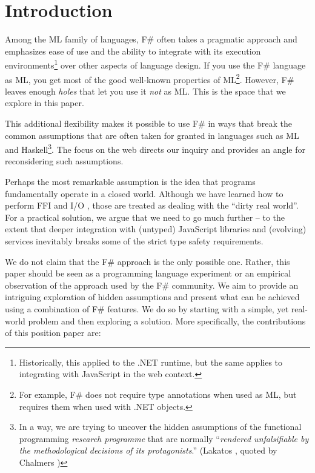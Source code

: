 \documentclass[submission,copyright,creativecommons]{eptcs}
\begin{document}
\section{Introduction}

Among the ML family of languages, F\# often takes a pragmatic approach and emphasizes ease of use
and the ability to integrate with its execution environments\footnote{Historically, this applied
to the .NET runtime, but the same applies to integrating with JavaScript in the web context.} over
other aspects of language design. If you use the F\# language as ML, you get most of the good
well-known properties of ML\footnote{For example, F\# does not require type annotations when used
as ML, but requires them when used with .NET objects.}. However, F\# leaves enough \emph{holes} that
let you use it \emph{not} as ML. This is the space that we explore in this paper.

This additional flexibility makes it possible to use F\# in ways that break the common assumptions
that are often taken for granted in languages such as ML and Haskell\footnote{In a way, we are trying
to uncover the hidden assumptions of the functional programming \emph{research programme} that are
normally ``\emph{rendered unfalsifiable by the methodological decisions of its protagonists}.''
(Lakatos \cite{philosophy-lakatos}, quoted by Chalmers \cite{philosophy-thing})}. The focus on
the web directs our inquiry and provides an angle for reconsidering such assumptions.

Perhaps the most remarkable assumption is the idea that programs fundamentally operate in a closed
world. Although we have learned how to perform FFI and I/O \cite{haskell-ffi,haskell-imperative},
those are treated as dealing with the ``dirty real world''. For a practical solution, we argue that
we need to go much further -- to the extent that deeper integration with (untyped) JavaScript
libraries and (evolving) services inevitably breaks some of the strict type safety requirements.

We do not claim that the F\# approach is the only possible one. Rather, this paper should be seen
as a programming language experiment \cite{philosophy-pl} or an empirical observation of the
approach used by the F\# community. We aim to provide an intriguing exploration of hidden assumptions
and present what can be achieved using a combination of F\# features. We do so by starting with
a simple, yet real-world problem and then exploring a solution. More specifically, the contributions
of this position paper are:
\end{document}
